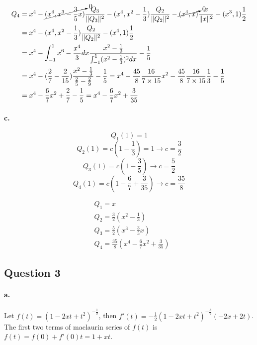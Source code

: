 \documentclass{article}
\begin{document}
\begin{equation}
  \begin{split}
    Q_4 &= x^4 - \cancelto{0}{(x^4, x^3 - \frac{3}{5}x)}\frac{Q_3}{\Vert Q_3 \Vert^2} - (x^4, x^2 - \frac{1}{3})\frac{Q_2}{\Vert Q_2 \Vert^2} - \cancelto{0}{(x^4,x)}\frac{x}{\Vert x \Vert^2} - (x^3,1)\frac{1}{2}\\
    &= x^4 - (x^4, x^2 - \frac{1}{3})\frac{Q_2}{\Vert Q_2 \Vert^2} - (x^4,1)\frac{1}{2} \\
    &= x^4 - \int^{1}_{-1} x^6 - \frac{ x^4}{3}dx \frac{x^2 - \frac{1}{3}}{\int^{1}_{-1} (x^2 - \frac{1}{3})^2 dx} - \frac{1}{5}\\
    &= x^4 - (\frac{2}{7} - \frac{2}{15}) \frac{x^2 - \frac{1}{3}}{\frac{2}{5}- \frac{2}{9}} - \frac{1}{5} = x^4 - \frac{45}{8}\frac{16}{7 \times 15} x^2 - \frac{45}{8}\frac{16}{7 \times 15}\frac{1}{3} - \frac{1}{5}\\
    &= x^4 - \frac{6}{7}x^2 + \frac{2}{7} - \frac{1}{5} = x^4 - \frac{6}{7}x^2 + \frac{3}{35}\\
  \end{split}
\end{equation}

\paragraph{c.}
$$ Q_1(1) = 1$$
$$ Q_2(1) = c (1 -  \frac{1}{3}) = 1  \rightarrow c = \frac{3}{2} $$
$$ Q_3(1) = c (1 - \frac{3}{5}) \rightarrow c = \frac{5}{2} $$
$$ Q_4(1) = c (1 - \frac{6}{7} + \frac{3}{35}) \rightarrow c = \frac{35}{8} $$

\begin{equation}
  \begin{split}
    &Q_1 = x\\
    &Q_2 = \frac{3}{2} (x^2 -  \frac{1}{3})\\
    &Q_3 = \frac{5}{2}(x^3 - \frac{3}{5}x)\\
    &Q_4 = \frac{35}{8}(x^4 - \frac{6}{7}x^2 + \frac{3}{35})
  \end{split}
\end{equation}


\subsection*{ Question 3}
\paragraph{a.}
Let $ f(t) = (1-2xt+t^2)^{-\frac{1}{2}}$, then $ f'(t) = -\frac{1}{2}(1-2xt+t^2)^{-\frac{3}{2}}(-2x+2t) $.
The first two terms of maclaurin series of $f(t)$ is
$f(t) = f(0) + f'(0)t = 1 + x t$.
\end{document}

